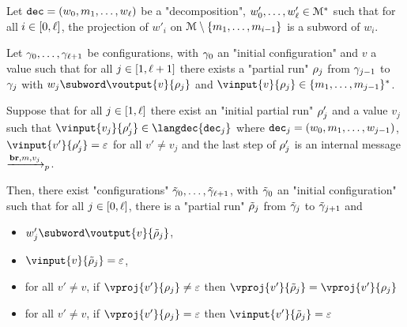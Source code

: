 \begin{lemma}
	\label{lem:follower-composition-output}
	Let $\mathtt{dec} = (w_0, m_1, \ldots, w_\ell)$ be a "decomposition", $w'_0, \ldots, w'_\ell \in \mathcal{M}^*$ such that for all $i \in [0,\ell]$, the projection of $w'_i$ on $\mathcal{M}\setminus \{m_1, \ldots, m_{i-1}\}$ is a subword of $w_i$.
	
	Let $\gamma_0, \ldots, \gamma_{\ell+1}$ be configurations, with $\gamma_0$ an "initial configuration" and $v$ a value such that for all $j \in[1,\ell+1]$ there exists a "partial run" $\rho_j$ from $\gamma_{j-1}$ to $\gamma_{j}$ with $w_j \subword \voutput{v}{\run_j}$ and $\vinput{v}{\run_j} \in \set{m_1,\ldots, m_{j-1}}^*$.
	
	Suppose that for all $j \in[1,\ell]$ there exist an "initial partial run" $\rho'_j$ and a value $v_j$ such that $\vinput{v_j}{\run'_j} \in \langdec{\decsymb_j}$ where $\mathtt{dec}_j = (w_0, m_1, \ldots, w_{j-1})$, $\vinput{v'}{\run'_j} = \varepsilon$ for all $v' \neq v_j$ and the last step of $\rho'_j$ is an internal message $\xrightarrow{\textbf{br}, m, v_j}_{p}$.
	
	Then, there exist "configurations" $\Tilde{\gamma}_0, \ldots, \Tilde{\gamma}_{\ell+1}$, with $\Tilde{\gamma}_0$ an "initial configuration" such that for all $j \in[0,\ell]$, there is a "partial run" $\Tilde{\rho}_j$ from $\Tilde{\gamma}_j$ to $\Tilde{\gamma}_{j+1}$ and
\begin{itemize}
	\item $w'_j \subword \voutput{v}{\Tilde{\run}_j}$, 
	
	\item $\vinput{v}{\Tilde{\run}_j} = \varepsilon$,
	
	\item for all $v' \neq v$, if $\vproj{v'}{\run_j} \neq \varepsilon$ then $\vproj{v'}{\Tilde{\run}_j} = \vproj{v'}{\run_j}$
	
	\item for all $v' \neq v$, if $\vproj{v'}{\run_j} = \varepsilon$ then $\vinput{v'}{\Tilde{\run}_j} = \varepsilon$
\end{itemize}
\end{lemma}

